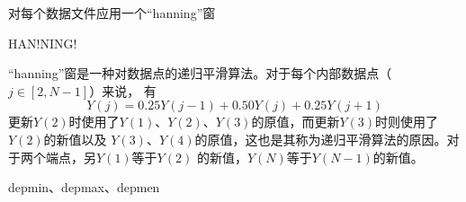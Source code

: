 \label{cmd:hanning}

对每个数据文件应用一个``hanning''窗

\begin{SACSTX}
HAN!NING!
\end{SACSTX}

``hanning''窗是一种对数据点的递归平滑算法。对于每个内部数据点（$j\in[2,N-1]$）来说，
有
\[
    Y(j)=0.25Y(j-1)+0.50Y(j)+0.25Y(j+1)
\]
更新$Y(2)$时使用了$Y(1)$、$Y(2)$、$Y(3)$的原值，而更新$Y(3)$时则使用了$Y(2)$的新值以及
$Y(3)$、$Y(4)$的原值，这也是其称为递归平滑算法的原因。对于两个端点，另$Y(1)$等于$Y(2)$
的新值，$Y(N)$等于$Y(N-1)$的新值。

depmin、depmax、depmen

